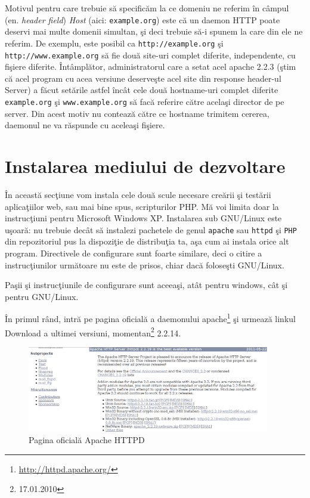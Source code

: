Motivul pentru care trebuie să specificăm la ce domeniu ne referim în câmpul
(en. \textsl{header field}) \textsl{Host} (aici: \texttt{example.org}) este că un daemon HTTP
poate deservi mai multe domenii simultan, şi deci trebuie să-i spunem la care
din ele ne referim.
De exemplu, este posibil ca \texttt{http://example.org} şi
\texttt{http://www.example.org} să fie două site-uri complet diferite, independente, cu
fişiere diferite. Întâmplător, administratorul care a setat acel apache 2.2.3 (ştim că
acel program cu acea versiune deserveşte acel site din response header-ul {\glqq}Server{\grqq}) a făcut setările astfel
încât cele două hostname-uri complet diferite \texttt{example.org} şi \texttt{www.example.org}
să facă referire către acelaşi director de pe server. Din acest motiv nu contează
către ce hostname trimitem cererea, daemonul ne va răspunde cu aceleaşi fişiere.

\section{Instalarea mediului de dezvoltare}
În această secţiune vom instala cele două scule necesare creării şi testării
aplicaţiilor web, sau mai bine spus, scripturilor PHP. Mă voi limita doar
la instrucţiuni
pentru Microsoft Windows XP. Instalarea sub GNU/Linux este uşoară: nu trebuie
decât să instalezi pachetele de genul \texttt{apache} sau \texttt{httpd}
şi \texttt{PHP} din repozitoriul
pus la dispoziţie de distribuţia ta, aşa cum ai instala orice alt program.
Directivele de configurare sunt foarte similare, deci o citire a instrucţiunilor
următoare nu este de prisos, chiar dacă foloseşti GNU/Linux.

Paşii şi instrucţiunile de configurare sunt aceeaşi,
atât pentru windows, cât şi pentru GNU/Linux.

În primul rând, intră pe pagina oficială a daemonului
apache\footnote{\url{http://httpd.apache.org/}} şi urmează linkul
Download a ultimei versiuni, momentan\footnote{17.01.2010} 2.2.14.


\begin{figure}[ht!]
  \centering
    \includegraphics[width=400px]{cap01/Screenshot.png}
  \caption{Pagina oficială Apache HTTPD}
  \label{fig:httpd homepage}
\end{figure}


